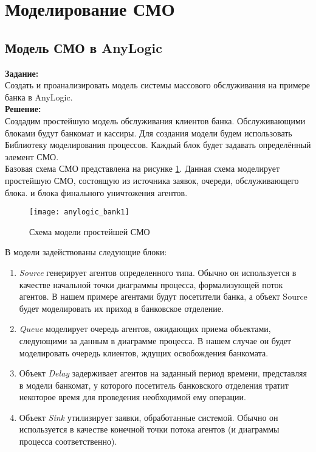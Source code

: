 \section*{Моделирование СМО}
\subsection*{Модель СМО в AnyLogic}

\textbf{Задание:}\\
Создать и проанализировать модель системы массового обслуживания на примере банка в AnyLogic.\\

\textbf{Решение:}\\
Создадим простейшую модель обслуживания клиентов банка. Обслуживающими блоками будут банкомат и кассиры. Для создания модели будем использовать Библиотеку моделирования процессов. Каждый блок будет задавать определённый элемент СМО.\\

Базовая схема СМО представлена на рисунке \ref{fig:anylogic_bank1}. Данная схема моделирует простейшую СМО, состоящую из источника заявок, очереди, обслуживающего блока. и блока финального уничтожения агентов.
\begin{figure}[h]
	\centering \texttt{[image: anylogic\_bank1]}
	\caption{Схема модели простейшей СМО}
	\label{fig:anylogic_bank1}
\end{figure}

В модели задействованы следующие блоки:
\begin{enumerate}[topsep=0pt,itemsep=-1ex,partopsep=1ex,parsep=1ex]
	\item \textit{Source} генерирует агентов определенного типа. Обычно он используется в качестве начальной точки диаграммы процесса, формализующей поток агентов. В нашем примере агентами будут посетители банка, а объект Source будет моделировать их приход в банковское отделение.
	\item \textit{Queue} моделирует очередь агентов, ожидающих приема объектами, следующими за данным в диаграмме процесса. В нашем случае он будет моделировать очередь клиентов, ждущих освобождения банкомата.
	\item Объект \textit{Delay} задерживает агентов на заданный период времени, представляя в модели банкомат, у которого посетитель банковского отделения тратит некоторое время для проведения необходимой ему операции.
	\item Объект \textit{Sink} утилизирует заявки, обработанные системой. Обычно он используется в качестве конечной точки потока агентов (и диаграммы процесса соответственно).\\
\end{enumerate}

